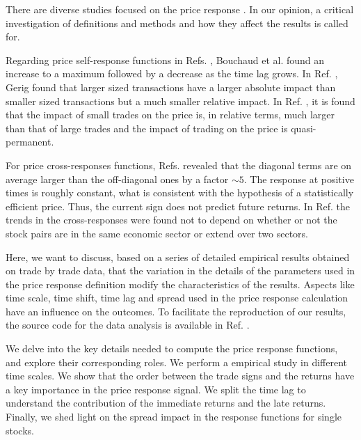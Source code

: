 There are diverse studies focused on the price response
\cite{prop_order_book,dissecting_cross,r_walks_liquidity,subtle_nature,Bouchaud_2004,large_prices_changes,pow_law_dist,theory_market_impact,spread_changes_affect,master_curve,EMH_lillo,quant_stock_price_response,ori_pow_law,Wang_2018_b,Wang_2018_a,Wang_2016_avg,Wang_2016_cross}.
In our opinion, a critical investigation of definitions and methods and how
they affect the results is called for.

Regarding price self-response functions in Refs.
\cite{r_walks_liquidity,subtle_nature,Bouchaud_2004}, Bouchaud et al. found an
increase to a maximum followed by a decrease as the time lag grows.
In Ref. \cite{theory_market_impact}, Gerig found that larger sized transactions
have a larger absolute impact than smaller sized transactions but a much
smaller relative impact. In Ref. \cite{prop_order_book}, it is found that the
impact of small trades on the price is, in relative terms, much larger than
that of large trades and the impact of trading on the price is quasi-permanent.

For price cross-responses functions, Refs.
\cite{dissecting_cross,Wang_2016_cross} revealed that the diagonal terms are on
average larger than the off-diagonal ones by a factor $\sim 5$. The response at
positive times is roughly constant, what is consistent with the hypothesis of a
statistically efficient price. Thus, the current sign does not predict future
returns. In Ref. \cite{Wang_2016_cross} the trends in the cross-responses were
found not to depend on whether or not the stock pairs are in the same economic
sector or extend over two sectors.

Here, we want to discuss, based on a series of detailed empirical results
obtained on trade by trade data, that the variation in the details of the
parameters used in the price response definition modify the characteristics of
the results. Aspects like time scale, time shift, time lag and spread used in
the price response calculation have an influence on the outcomes. To facilitate
the reproduction of our results, the source code for the data analysis is
available in Ref. \cite{code}.

We delve into the key details needed to compute the price response functions,
and explore their corresponding roles. We perform a empirical study in
different time scales. We show that the order between the trade signs and
the returns have a key importance in the price response signal. We split the
time lag to understand the contribution of the immediate returns and the late
returns. Finally, we shed light on the spread impact in the response functions
for single stocks.

